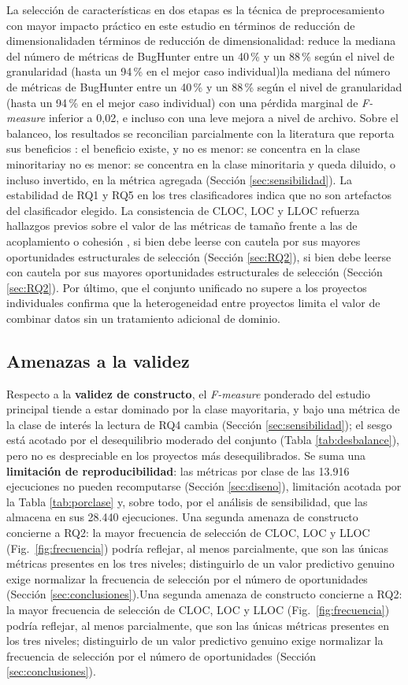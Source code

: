 \documentclass[conference,a4paper]{IEEEtran}
\newif\ifmarcarcambios
\newcommand{\cambio}[1]{\ifmarcarcambios\ifvmode\leavevmode\fi{\color{azulcambio}#1}\else#1\fi}
\begin{document}
La selección de características en dos etapas es la técnica de preprocesamiento con mayor impacto práctico en este estudio \cambio{en términos de reducción de dimensionalidad}: reduce \cambio{la mediana del número de métricas de BugHunter entre un 40\,\% y un 88\,\% según el nivel de granularidad (hasta un 94\,\% en el mejor caso individual)} con una pérdida marginal de \textit{F-measure} inferior a 0,02, e incluso con una leve mejora a nivel de archivo. Sobre el balanceo, los resultados se reconcilian parcialmente con la literatura que reporta sus beneficios \cite{tantithamthavorn2020,rathi2023}: el beneficio existe, \cambio{y no es menor: se concentra en la clase minoritaria} y queda diluido, o incluso invertido, en la métrica agregada (Sección \ref{sec:sensibilidad}). La estabilidad de RQ1 y RQ5 en los tres clasificadores indica que no son artefactos del clasificador elegido. La consistencia de CLOC, LOC y LLOC refuerza hallazgos previos sobre el valor de las métricas de tamaño frente a las de acoplamiento o cohesión \cite{radjenovic2013}\cambio{, si bien debe leerse con cautela por sus mayores oportunidades estructurales de selección (Sección \ref{sec:RQ2})}. Por último, que el conjunto unificado no supere a los proyectos individuales confirma que la heterogeneidad entre proyectos limita el valor de combinar datos sin un tratamiento adicional de dominio.

\subsection{Amenazas a la validez}
\label{sec:amenazas}

Respecto a la \textbf{validez de constructo}, el \textit{F-measure} ponderado del estudio principal tiende a estar dominado por la clase mayoritaria, y bajo una métrica de la clase de interés la lectura de RQ4 cambia (Sección \ref{sec:sensibilidad}); el sesgo está acotado por el desequilibrio moderado del conjunto (Tabla \ref{tab:desbalance}), pero no es despreciable en los proyectos más desequilibrados. Se suma una \textbf{limitación de reproducibilidad}: las métricas por clase de las 13.916 ejecuciones no pueden recomputarse (Sección \ref{sec:diseno}), limitación acotada por la Tabla \ref{tab:porclase} y, sobre todo, por el análisis de sensibilidad, que las almacena en sus 28.440 ejecuciones. \cambio{Una segunda amenaza de constructo concierne a RQ2: la mayor frecuencia de selección de CLOC, LOC y LLOC (Fig.~\ref{fig:frecuencia}) podría reflejar, al menos parcialmente, que son las únicas métricas presentes en los tres niveles; distinguirlo de un valor predictivo genuino exige normalizar la frecuencia de selección por el número de oportunidades (Sección \ref{sec:conclusiones}).}
\end{document}
